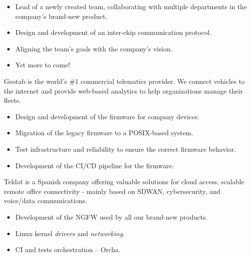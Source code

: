 \documentclass[10pt,a4paper,ragged2e]{altacv}
\begin{document}

\begin{itemize}
  \item Lead of a newly created team, collaborating with multiple departments in the company's
        brand-new product.
  \item Design and development of an inter-chip communication protocol.
  \item Aligning the team's goals with the company's vision.
  \item Yet more to come!
\end{itemize}

\divider

{\small Geotab is the world's \#1 commercial telematics provider. We connect vehicles to the internet and provide web-based analytics to help organizations manage their fleets.}

\begin{itemize}
  \item Design and development of the firmware for company devices.
  \item Migration of the legacy firmware to a POSIX-based system.
  \item Test infrastructure and reliability to ensure the correct firmware behavior.
  \item Development of the CI/CD pipeline for the firmware.
\end{itemize}

\divider

{\small Teldat is a Spanish company offering valuable solutions for cloud access, scalable remote office
connectivity - mainly based on SDWAN, cybersecurity, and voice/data communications.}

\begin{itemize}
  \item Development of the NGFW used by all our brand-new products.
  \item Linux kernel \textit{drivers} and \textit{networking}.
  \item CI and tests orchestration -- Orcha.
\end{itemize}


\end{document}
